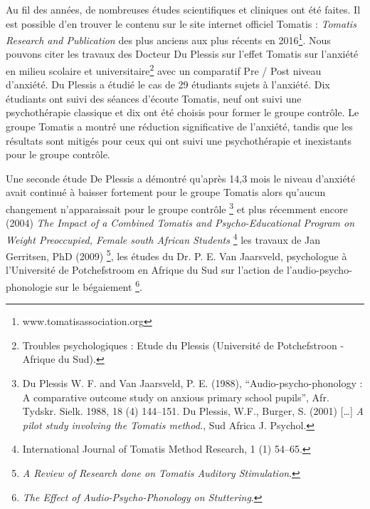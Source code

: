 Au fil des années, de nombreuses études scientifiques et cliniques
ont été faites. Il est possible d'en trouver le contenu sur le site
internet officiel Tomatis : \emph{Tomatis Research and Publication}  des plus
anciens aux plus récents en 2016\footnote{www.tomatisassociation.org}.
Nous pouvons citer les travaux des Docteur Du Plessis sur l'effet
Tomatis sur l'anxiété en milieu scolaire et universitaire\footnote{Troubles psychologiques : Etude du Plessis (Université de Potchefstroon
- Afrique du Sud).} avec un comparatif Pre / Post niveau d'anxiété.
Du Plessis a étudié le cas de 29 étudiants sujets à l'anxiété.
Dix étudiants ont suivi des séances d'écoute Tomatis,
neuf ont suivi une psychothérapie classique et dix ont été choisis pour
former le groupe contrôle. Le groupe Tomatis a montré
une réduction significative de l'anxiété, tandis que
les résultats sont mitigés pour ceux qui ont suivi une psychothérapie
et inexistants pour le groupe contrôle.

Une seconde étude De Plessis a démontré qu'après 14,3
mois le niveau d'anxiété avait continué à baisser fortement
pour le groupe Tomatis alors qu'aucun
changement n'apparaissait pour le groupe contrôle%
\footnote{Du Plessis W. F. and Van Jaarsveld, P. E. (1988),
	``Audio-psycho-phonology : A comparative outcome study on anxious primary school pupils'',  Afr. Tydskr. Sielk. 1988,
	18 (4) 144--151. Du Plessis, W.F., Burger, S. (2001) [\ldots]
	\emph{A pilot study involving the Tomatis method.}, Sud Africa J. Psychol.}
 et plus récemment encore (2004) \emph{The Impact of a Combined
 	Tomatis and Psycho-Educational Program on Weight Preoccupied,
 	 Female south African Students}%
  \footnote{International Journal of Tomatis Method Research, 1 (1) 54--65.}  les travaux de Jan Gerritsen, PhD (2009)%
  \footnote{\emph{A Review of Research done on Tomatis Auditory Stimulation}.},
  les études du Dr. P. E. Van Jaarsveld, psychologue à l'Université de Potchefstroom en Afrique du Sud sur l'action de l'audio-psycho-phonologie sur le bégaiement%
  \footnote{\emph{The Effect of Audio-Psycho-Phonology on Stuttering}.}.

